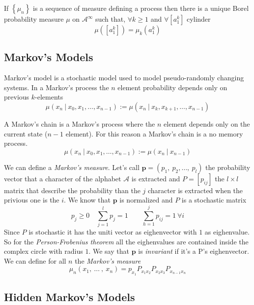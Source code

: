 \begin{theorem}
    If $\left\{\mu_n\right\}$ is a sequence of measure defining a process then there is a unique Borel probability measure $\mu$ on $\mathcal{A}^\infty$ such that, $\forall k \geq 1$ and $\forall \left[a_1^k\right]$ cylinder
    \begin{equation*}
        \mu\left(\left[a_1^k\right]\right) = \mu_k\left(a_1^k\right)
    \end{equation*}
\end{theorem}

\subsection{Markov's Models}
Markov's model is a stochastic model used to model pseudo-randomly changing systems.
In a Markov's process the $n$ element probability depends only on previous $k$-elements
\begin{equation}
\mu\left(x_{n}\ \vert\ x_{0}, x_{1}, \dots, x_{n-1}\right):=\mu\left(x_{n}\ \vert\ x_{k}, x_{k+1}, \dots, x_{n-1}\right)
\end{equation}

A Markov's chain is a Markov's process where the $n$ element depends only on the current state ($n-1$ element).
For this reason a Markov's chain is a no memory process.
\begin{equation}
\mu\left(x_{n}\ \vert\ x_{0}, x_{1}, \dots, x_{n-1}\right):=\mu\left(x_{n}\ \vert\ x_{n-1}\right)
\end{equation}

We can define a \emph{Markov's measure}.
Let's call $\mathbf{p}=\left(p_{1},\ p_{2},\dots ,\ p_{l}\right)$ the probability vector that a character of the alphabet $\mathcal{A}$ is extracted and $P=\left[p_{ij}\right]$ the $l\times l$ matrix that describe the probability than the $j$ character is extracted when the privious one is the $i$.
We know that $\mathbf{p}$ is normalized and $P$ is a stochastic matrix
\[p_{j}\geq 0\quad \sum_{j=1}^{l}p_{j}=1\qquad\sum_{h=1}^{j}p_{ij}=1\ \forall i\]
Since $P$ is stochastic it has the uniti vector as eighenvector with $1$ as eighenvalue.
So for the \emph{Person-Frobenius theorem} all the eighenvalues are contained inside the complex circle with radius $1$.
We say that $\mathbf{p}$ is \emph{invariant} if it's a P's eighenvector. We can define for all $n$ the \emph{Markov's measure}
\begin{equation}
\mu_{n}\left(x_{1},\ \dots\ ,\ x_{n}\right)=p_{x_{1}}P_{x_{1}x_{2}}P_{x_{2}x_{3}}P_{x_{n-1}x_{n}}
\end{equation}


\subsection{Hidden Markov's Models}